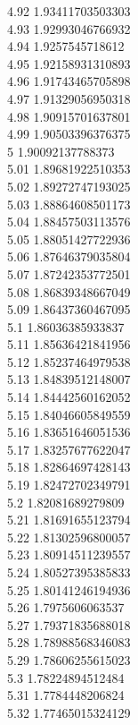{4.92	1.93411703503303\\
4.93	1.92993046766932\\
4.94	1.9257545718612\\
4.95	1.92158931310893\\
4.96	1.91743465705898\\
4.97	1.91329056950318\\
4.98	1.90915701637801\\
4.99	1.90503396376375\\
5	1.90092137788373\\
5.01	1.89681922510353\\
5.02	1.89272747193025\\
5.03	1.88864608501173\\
5.04	1.88457503113576\\
5.05	1.88051427722936\\
5.06	1.87646379035804\\
5.07	1.87242353772501\\
5.08	1.86839348667049\\
5.09	1.86437360467095\\
5.1	1.86036385933837\\
5.11	1.85636421841956\\
5.12	1.85237464979538\\
5.13	1.84839512148007\\
5.14	1.84442560162052\\
5.15	1.84046605849559\\
5.16	1.83651646051536\\
5.17	1.83257677622047\\
5.18	1.82864697428143\\
5.19	1.82472702349791\\
5.2	1.82081689279809\\
5.21	1.81691655123794\\
5.22	1.81302596800057\\
5.23	1.80914511239557\\
5.24	1.80527395385833\\
5.25	1.80141246194936\\
5.26	1.7975606063537\\
5.27	1.79371835688018\\
5.28	1.78988568346083\\
5.29	1.78606255615023\\
5.3	1.78224894512484\\
5.31	1.7784448206824\\
5.32	1.77465015324129\\
}
